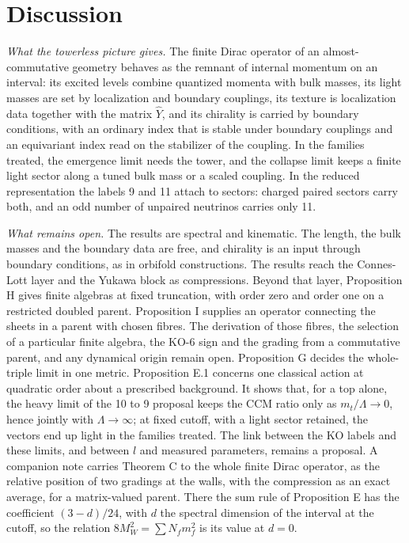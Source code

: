 \documentclass[aps,prd,reprint,onecolumn,nofootinbib,amsmath,amssymb,floatfix]{revtex4-2}
\theoremstyle{plain}
\begin{document}
\section{Discussion}

\emph{What the towerless picture gives.} The finite Dirac operator of an almost-commutative geometry behaves as the remnant of internal momentum on an interval: its excited levels combine quantized momenta with bulk masses, its light masses are set by localization and boundary couplings, its texture is localization data together with the matrix $\hat Y$, and its chirality is carried by boundary conditions, with an ordinary index that is stable under boundary couplings and an equivariant index read on the stabilizer of the coupling. In the families treated, the emergence limit needs the tower, and the collapse limit keeps a finite light sector along a tuned bulk mass or a scaled coupling. In the reduced representation the labels 9 and 11 attach to sectors: charged paired sectors carry both, and an odd number of unpaired neutrinos carries only 11.

\emph{What remains open.} The results are spectral and kinematic. The length, the bulk masses and the boundary data are free, and chirality is an input through boundary conditions, as in orbifold constructions. The results reach the Connes-Lott layer and the Yukawa block as compressions. Beyond that layer, Proposition H gives finite algebras at fixed truncation, with order zero and order one on a restricted doubled parent. Proposition I supplies an operator connecting the sheets in a parent with chosen fibres. The derivation of those fibres, the selection of a particular finite algebra, the KO-6 sign and the grading from a commutative parent, and any dynamical origin remain open. Proposition G decides the whole-triple limit in one metric. Proposition E.1 concerns one classical action at quadratic order about a prescribed background. It shows that, for a top alone, the heavy limit of the 10 to 9 proposal keeps the CCM ratio only as $m_t/\Lambda\to0$, hence jointly with $\Lambda\to\infty$; at fixed cutoff, with a light sector retained, the vectors end up light in the families treated. The link between the KO labels and these limits, and between $l$ and measured parameters, remains a proposal. A companion note \cite{boundarynote} carries Theorem C to the whole finite Dirac operator, as the relative position of two gradings at the walls, with the compression as an exact average, for a matrix-valued parent. There the sum rule of Proposition E has the coefficient $(3-d)/24$, with $d$ the spectral dimension of the interval at the cutoff, so the relation $8M_W^2=\sum N_fm_f^2$ is its value at $d=0$.
\end{document}
